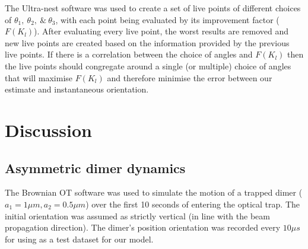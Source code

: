 \documentclass[final, 3p]{elsarticle}
\begin{document}
The Ultra-nest software was used to create a set of live points of different choices of $\theta_1, \ \theta_2, \ \& \ \theta_3$, with each point being evaluated by its improvement factor ($F(K_l)$). After evaluating every live point, the worst results are removed and new live points are created based on the information provided by the previous live points. If there is a correlation between the choice of angles and $F(K_l)$ then the live points should congregate around a single (or multiple) choice of angles that will maximise $F(K_l)$ and therefore minimise the error between our estimate and instantaneous orientation. 

\section{Discussion}
\label{sec:Discussion}
\subsection{Asymmetric dimer dynamics}
\label{sec:3.1}
The Brownian OT software was used to simulate the motion of a trapped dimer ($a_1=1\mu m, a_2=0.5\mu m$) over the first 10 seconds of entering the optical trap. The initial orientation was assumed as strictly vertical (in line with the beam propagation direction). The dimer's position orientation was recorded every $10 \mu s$ for using as a test dataset for our model. 
\end{document}

